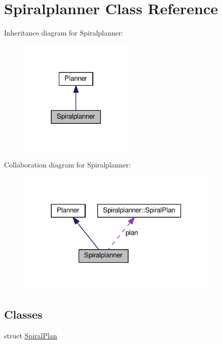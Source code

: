 \hypertarget{classSpiralplanner}{}\section{Spiralplanner Class Reference}
\label{classSpiralplanner}


Inheritance diagram for Spiralplanner\+:\nopagebreak
\begin{figure}[H]
\begin{center}
\leavevmode
\includegraphics[width=153pt]{classSpiralplanner__inherit__graph}
\end{center}
\end{figure}


Collaboration diagram for Spiralplanner\+:\nopagebreak
\begin{figure}[H]
\begin{center}
\leavevmode
\includegraphics[width=272pt]{classSpiralplanner__coll__graph}
\end{center}
\end{figure}
\subsection*{Classes}
\begin{DoxyCompactItemize}
\item 
struct \hyperlink{structSpiralplanner_1_1SpiralPlan}{Spiral\+Plan}
\end{DoxyCompactItemize}
